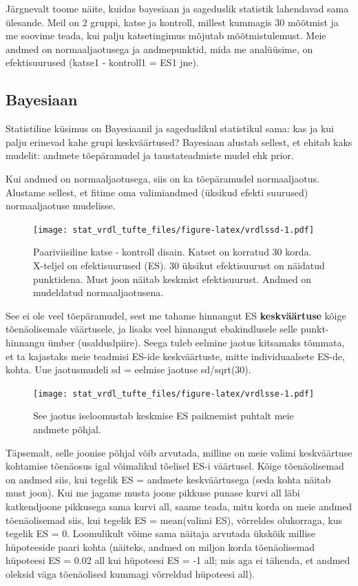 \documentclass[]{book}
\begin{document}
Järgnevalt toome näite, kuidas bayesiaan ja sageduslik statistik lahendavad sama ülesande.
Meil on 2 gruppi, katse ja kontroll, millest kummagis 30 mõõtmist ja me soovime teada, kui palju katsetingimus mõjutab mõõtmistulemust.
Meie andmed on normaaljaotusega ja andmepunktid, mida me analüüsime, on efektisuurused (katse1 - kontroll1 = ES1 jne).

\hypertarget{bayesiaan-1}{%
\subsection*{Bayesiaan}\label{bayesiaan-1}}

Statistiline küsimus on Bayesiaanil ja sageduslikul statistikul sama: kas ja kui palju erinevad kahe grupi keskväärtused?
Bayesiaan alustab sellest, et ehitab kaks mudelit: andmete tõepäramudel ja taustateadmiste mudel ehk prior.

Kui andmed on normaaljaotusega, siis on ka tõepäramudel normaaljaotus.
Alustame sellest, et fitime oma valimiandmed (üksikud efekti suurused) normaaljaotuse mudelisse.

\begin{figure}
\centering
\texttt{[image: stat\_vrdl\_tufte\_files/figure-latex/vrdlssd-1.pdf]}
\caption{\label{fig:vrdlssd}Paariviisiline katse - kontroll disain. Katset on korratud 30 korda. X-teljel on efektisuurused (ES). 30 üksikut efektisuurust on näidatud punktidena. Must joon näitab keskmist efektisuurust. Andmed on mudeldatud normaaljaotusena.}
\end{figure}

See ei ole veel tõepäramudel, sest me tahame hinnangut ES \textbf{keskväärtuse} kõige tõenäolisemale väärtusele, ja lisaks veel hinnangut ebakindlusele selle punkt-hinnangu ümber (usalduslpiire).
Seega tuleb eelmine jaotus kitsamaks tõmmata, et ta kajastaks meie teadmisi ES-ide keskväärtuste, mitte individuaalsete ES-de, kohta.
Uue jaotusmudeli sd = eelmise jaotuse sd/sqrt(30).

\begin{figure}
\centering
\texttt{[image: stat\_vrdl\_tufte\_files/figure-latex/vrdlsse-1.pdf]}
\caption{\label{fig:vrdlsse}See jaotus iseloomustab keskmise ES paiknemist puhtalt meie andmete põhjal.}
\end{figure}

Täpsemalt, selle joonise põhjal võib arvutada, milline on meie valimi keskväärtuse kohtamise tõenäosus igal võimalikul tõelisel ES-i väärtusel.
Kõige tõenäolisemad on andmed siis, kui tegelik ES = andmete keskväärtusega (seda kohta näitab must joon).
Kui me jagame musta joone pikkuse punase kurvi all läbi katkendjoone pikkusega sama kurvi all, saame teada, mitu korda on meie andmed tõenäolisemad siis, kui tegelik ES = mean(valimi ES), võrreldes olukorraga, kus tegelik ES = 0.
Loomulikult võime sama näitaja arvutada ükskõik millise hüpoteeside paari kohta (näiteks, andmed on miljon korda tõenäolisemad hüpoteesi ES = 0.02 all kui hüpoteesi ES = -1 all; mis aga ei tähenda, et andmed oleksid väga tõenäolised kummagi võrreldud hüpoteesi all).
\end{document}
